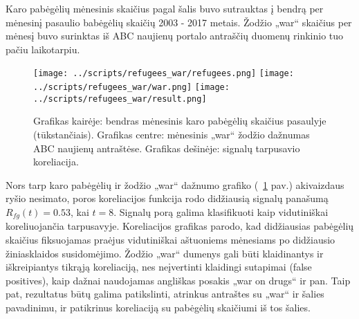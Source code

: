 Karo pabėgėlių mėnesinis skaičius pagal šalis\cite{refugees} buvo sutrauktas į bendrą per mėnesinį pasaulio babėgėlių skaičių 2003 - 2017 metais.
Žodžio „war“ skaičius per mėnesį buvo surinktas iš ABC naujienų portalo antraščių\cite{abcNews} duomenų rinkinio tuo pačiu laikotarpiu.

\begin{figure}
    \texttt{[image: ../scripts/refugees\_war/refugees.png]}
    \texttt{[image: ../scripts/refugees\_war/war.png]}
    \texttt{[image: ../scripts/refugees\_war/result.png]}
    \caption{Grafikas kairėje: bendras mėnesinis karo pabėgėlių skaičius pasaulyje (tūkstančiais). Grafikas centre: mėnesinis „war“ žodžio dažnumas ABC naujienų antraštėse. Grafikas dešinėje: signalų tarpusavio koreliacija.}
    \label{fig:refugees}
\end{figure}

Nors tarp karo pabėgėlių ir žodžio „war“ dažnumo grafiko (~\ref{fig:refugees} pav.) akivaizdaus ryšio nesimato,
poros koreliacijos funkcija rodo didžiausią signalų panašumą \( R_{fg}(t) = 0.53 \), kai \( t = 8 \).
Signalų porą galima klasifikuoti kaip vidutiniškai koreliuojančia tarpusavyje.
Koreliacijos grafikas parodo, kad didžiausias pabėgėlių skaičius fiksuojamas praėjus vidutiniškai aštuoniems mėnesiams po didžiausio žiniasklaidos susidomėjimo.
Žodžio „war“ dumenys gali būti klaidinantys ir iškreipiantys tikrąją koreliaciją, nes neįvertinti klaidingi sutapimai (false positives), kaip dažnai naudojamas angliškas posakis „war on drugs“ ir pan.
Taip pat, rezultatus būtų galima patikslinti, atrinkus antraštes su „war“ ir šalies pavadinimu, ir patikrinus koreliaciją su pabėgėlių skaičiumi iš tos šalies.
